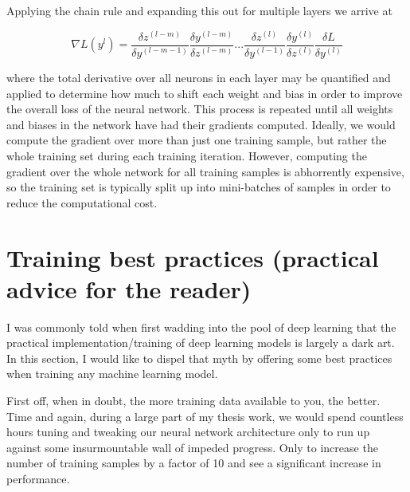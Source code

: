 Applying the chain rule and expanding this out for multiple layers we arrive at

\begin{equation}
    \nabla L(y^{l}) = \frac{\delta z^{(l-m)}}{\delta y^{(l-m-1)}} \frac{\delta y^{(l-m)}}{\delta z^{(l-m)}} ... \frac{\delta z^{(l)}}{\delta y^{(l-1)}} \frac{\delta y^{(l)}}{\delta z^{(l)}} \frac{\delta L}{\delta y^{(l)}} 
\end{equation}{}

where the total derivative over all neurons in each layer may be quantified and applied to determine how much to shift each weight and bias in order to improve the overall loss of the neural network. This process is repeated until all weights and biases in the network have had their gradients computed. Ideally, we would compute the gradient over more than just one training sample, but rather the whole training set during each training iteration. However, computing the gradient over the whole network for all training samples is abhorrently expensive, so the training set is typically split up into mini-batches of samples in order to reduce the computational cost.

%
%
\section{Training best practices (practical advice for the reader)}

I was commonly told when first wadding into the pool of deep learning that the practical implementation/training of deep learning models is largely a dark art. In this section, I would like to dispel that myth by offering some best practices when training any machine learning model.

%
%
First off, when in doubt, the more training data available to you, the better. Time and again, during a large part of my thesis work, we would spend countless hours tuning and tweaking our neural network architecture only to run up against some insurmountable wall of impeded progress. Only to increase the number of training samples by a factor of 10 and see a significant increase in performance. 

%
%
